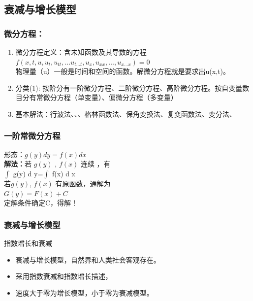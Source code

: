 \subsection{衰减与增长模型}
\begin{frame}
	\frametitle{微分方程：}
    \begin{enumerate}
    \item 微分方程定义：含未知函数及其导数的方程 \\
    	$f\left(x,t, u, u_t,u_{tt}, \ldots u_{t \ldots t}, u_{x}, u_{xx}, \ldots, u_{x \ldots x} \right)=0$ \\
    	\vspace{0.5cm}
 		物理量（u）一般是时间和空间的函数。解微分方程就是要求出u(x,t)。
	\item 分类(1): 按阶分有一阶微分方程、二阶微分方程、高阶微分方程。按自变量数目分有常微分方程（单变量）、偏微分方程（多变量） 
    	\vspace{0.5cm}
    \item 基本解法：行波法、{\color{deepred}{分离变量法}}、{\color{deepred}{积分变换法}}、格林函数法、保角变换法、复变函数法、变分法、\color{deepred}{级数展开法}         
    \end{enumerate}
\end{frame}

\begin{frame}
	\frametitle{一阶常微分方程}
	{\large 形态：$g(y)dy=f(x)dx$ }\\ \vspace{0.6cm}
	\textbf{解法：}若 $g(y)$ , $f(x)$ 连续 ，有\\	\vspace{0.3cm}
   	{\large 	$\int$ g(y) d y=$\int$ f(x) d x }\\	\vspace{0.3cm}
	若$g(y)$, $f(x)$  有原函数，通解为\\	\vspace{0.3cm}
	{\large $G(y)=F(x)+C$}\\	\vspace{0.3cm}
	定解条件确定C，得解！
\end{frame}

\begin{frame}
\frametitle{衰减与增长模型}
	\begin{block}{指数增长和衰减}
	\begin{itemize}
		\item 衰减与增长模型，自然界和人类社会客观存在。
		\item 采用指数衰减和指数增长描述，
		\item 速度大于零为增长模型，小于零为衰减模型。
	\end{itemize}
	\end{block}
\end{frame}

